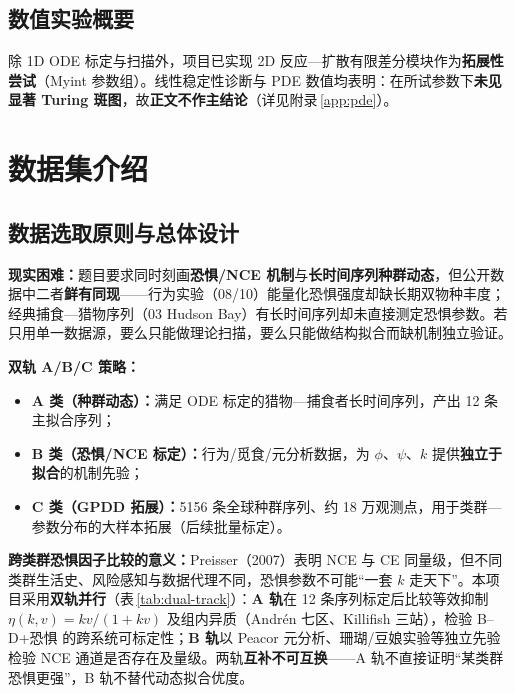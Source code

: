 \documentclass[12pt,a4paper]{ctexart}
\begin{document}
\subsection{数值实验概要}

除 1D ODE 标定与扫描外，项目已实现 2D 反应—扩散有限差分模块作为\textbf{拓展性尝试}（Myint 参数组）。线性稳定性诊断与 PDE 数值均表明：在所试参数下\textbf{未见显著 Turing 斑图}，故\textbf{正文不作主结论}（详见附录\,\ref{app:pde}）。

\section{数据集介绍}
\label{sec:data}

\subsection{数据选取原则与总体设计}

\textbf{现实困难：}题目要求同时刻画\textbf{恐惧/NCE 机制}与\textbf{长时间序列种群动态}，但公开数据中二者\textbf{鲜有同现}——行为实验（08/10）能量化恐惧强度却缺长期双物种丰度；经典捕食—猎物序列（03 Hudson Bay）有长时间序列却未直接测定恐惧参数。若只用单一数据源，要么只能做理论扫描，要么只能做结构拟合而缺机制独立验证。

\textbf{双轨 A/B/C 策略：}
\begin{itemize}[leftmargin=2em]
  \item \textbf{A 类（种群动态）：}满足 ODE 标定的猎物—捕食者长时间序列，产出 12 条主拟合序列；
  \item \textbf{B 类（恐惧/NCE 标定）：}行为/觅食/元分析数据，为 $\phi$、$\psi$、$k$ 提供\textbf{独立于拟合}的机制先验；
  \item \textbf{C 类（GPDD 拓展）：}5156 条全球种群序列、约 18 万观测点，用于类群—参数分布的大样本拓展（后续批量标定）。
\end{itemize}

\textbf{跨类群恐惧因子比较的意义：}Preisser（2007）表明 NCE 与 CE 同量级，但不同类群生活史、风险感知与数据代理不同，恐惧参数不可能“一套 $k$ 走天下”。本项目采用\textbf{双轨并行}（表\,\ref{tab:dual-track}）：\textbf{A 轨}在 12 条序列标定后比较等效抑制 $\eta(k,v)=kv/(1+kv)$ 及组内异质（Andrén 七区、Killifish 三站），检验 B--D+恐惧 的跨系统可标定性；\textbf{B 轨}以 Peacor 元分析、珊瑚/豆娘实验等独立先验检验 NCE 通道是否存在及量级。两轨\textbf{互补不可互换}——A 轨不直接证明“某类群恐惧更强”，B 轨不替代动态拟合优度。
\end{document}
